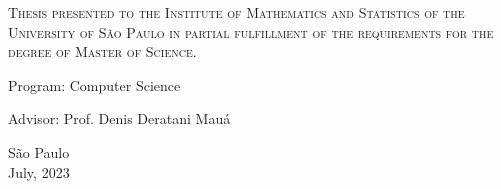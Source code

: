 
\begin{center}
  \begin{minipage}{9cm}
    \centering

    \begin{spacing}{1.6}
      {
        \LARGE
        \textbf{\@title}
      }
    \end{spacing}

    \vspace{1.5cm}

    {\Large \@author}
  \end{minipage}

  \vspace{3.3cm}


  \begin{minipage}{10.5cm}
    \centering

    \textsc{
      Thesis presented to the Institute of Mathematics and Statistics of the University of São Paulo in partial fulfillment of the requirements for the degree of Master of Science.
    }
  \end{minipage}

  \vspace{3.3cm}

  {
    \large
    Program: Computer Science

    Advisor: Prof. Denis Deratani Mauá
  }

  \vspace{3.3cm}

  São Paulo\\
  July, 2023

\end{center}

\blankpage

\newpage
\thispagestyle{empty}
\restoregeometry
{}

\begin{center}
  \begin{minipage}{9cm}
    \centering

    \begin{spacing}{1.6}
      {
        \LARGE
        \textbf{\@title}
      }
    \end{spacing}

    \vspace{1.5cm}

    {\Large \@author}
  \end{minipage}
\end{center}

